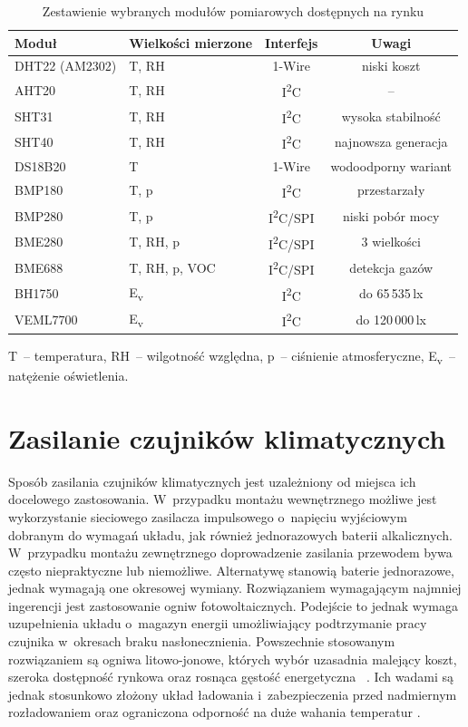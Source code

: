 \begin{table}[h]
\centering
\caption{Zestawienie wybranych modułów pomiarowych dostępnych na rynku}
\label{tab:czujniki_rynek}
\small
\begin{tabular}{llcc}
\toprule
\textbf{Moduł} & \textbf{Wielkości mierzone} & \textbf{Interfejs} & \textbf{Uwagi} \\
\midrule
DHT22 (AM2302)  & T, RH & 1-Wire & niski koszt \\
AHT20       & T, RH & I\textsuperscript{2}C & -- \\
SHT31           & T, RH & I\textsuperscript{2}C & wysoka stabilność \\
SHT40           & T, RH & I\textsuperscript{2}C & najnowsza generacja \\
DS18B20         & T & 1-Wire & wodo\-odporny wariant \\
BMP180          & T, p & I\textsuperscript{2}C & przestarzały \\
BMP280      & T, p & I\textsuperscript{2}C/SPI & niski pobór mocy \\
BME280          & T, RH, p & I\textsuperscript{2}C/SPI & 3 wielkości \\
BME688          & T, RH, p, VOC & I\textsuperscript{2}C/SPI & detekcja gazów \\
BH1750          & E\textsubscript{v} & I\textsuperscript{2}C & do 65\,535\,lx \\
VEML7700    & E\textsubscript{v} & I\textsuperscript{2}C & do 120\,000\,lx \\
\bottomrule
\end{tabular}
\medskip

\raggedright\footnotesize
T~-- temperatura, RH~-- wilgotność względna, p~-- ciśnienie atmosferyczne, 
E\textsubscript{v}~-- natężenie oświetlenia.
\end{table}

 
\section{Zasilanie czujników klimatycznych}
\label{section:powering_climate_sensors}
Sposób zasilania czujników klimatycznych jest uzależniony od miejsca 
ich docelowego zastosowania. W~przypadku montażu wewnętrznego 
możliwe jest wykorzystanie sieciowego zasilacza impulsowego 
o~napięciu wyjściowym dobranym do wymagań układu, jak również 
jednorazowych baterii alkalicznych. W~przypadku montażu zewnętrznego 
doprowadzenie zasilania przewodem bywa często niepraktyczne lub 
niemożliwe. Alternatywę stanowią baterie jednorazowe, jednak wymagają 
one okresowej wymiany.
Rozwiązaniem wymagającym najmniej ingerencji jest zastosowanie ogniw 
fotowoltaicznych. Podejście to jednak wymaga uzupełnienia układu 
o~magazyn energii umożliwiający podtrzymanie pracy czujnika w~okresach 
braku nasłonecznienia. Powszechnie stosowanym rozwiązaniem są ogniwa 
litowo-jonowe, których wybór uzasadnia malejący koszt, szeroka 
dostępność rynkowa oraz rosnąca gęstość energetyczna 
~\cite{Lithium-ion_batteries_for_Electric_Vehicles}. 
Ich wadami są jednak stosunkowo złożony układ ładowania i~zabezpieczenia 
przed nadmiernym rozładowaniem oraz ograniczona odporność na duże 
wahania temperatur \cite{Comparing_Supercapacitors_to_Lithium-Ion_Batteries}.

